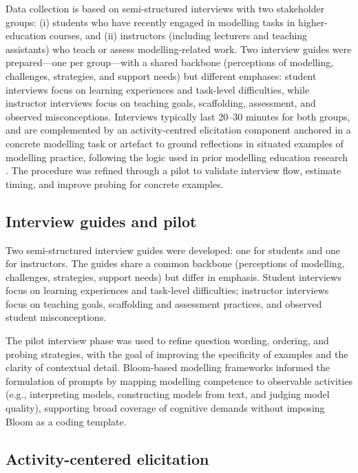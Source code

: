 Data collection is based on semi-structured interviews with two stakeholder groups: (i) students who have recently engaged in modelling tasks in higher-education courses, and (ii) instructors (including lecturers and teaching assistants) who teach or assess modelling-related work. Two interview guides were prepared---one per group---with a shared backbone (perceptions of modelling, challenges, strategies, and support needs) but different emphases: student interviews focus on learning experiences and task-level difficulties, while instructor interviews focus on teaching goals, scaffolding, assessment, and observed misconceptions. Interviews typically last 20--30 minutes for both groups, and are complemented by an activity-centred elicitation component anchored in a concrete modelling task or artefact to ground reflections in situated examples of modelling practice, following the logic used in prior modelling education research \cite{istar-learning}. The procedure was refined through a pilot to validate interview flow, estimate timing, and improve probing for concrete examples.


\subsection{Interview guides and pilot}
\label{subsec:method_instruments_pilot}

Two semi-structured interview guides were developed: one for students and one for instructors. The guides share a common backbone (perceptions of modelling, challenges, strategies, support needs) but differ in emphasis. Student interviews focus on learning experiences and task-level difficulties; instructor interviews focus on teaching goals, scaffolding and assessment practices, and observed student misconceptions.

The pilot interview phase was used to refine question wording, ordering, and probing strategies, with the goal of improving the specificity of examples and the clarity of contextual detail. Bloom-based modelling frameworks informed the formulation of prompts by mapping modelling competence to observable activities (e.g., interpreting models, constructing models from text, and judging model quality), supporting broad coverage of cognitive demands without imposing Bloom as a coding template.

\subsection{Activity-centered elicitation}
\label{subsec:method_modelling_task}

